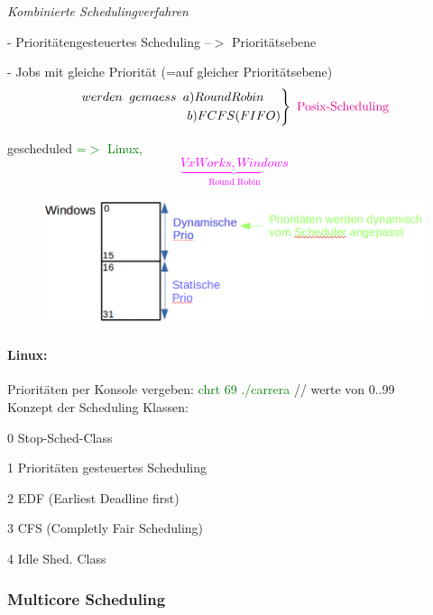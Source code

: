 \documentclass[12pt,a4paper,oneside,ngerman]{article}
\begin{document}
\emph{Kombinierte Schedulingverfahren}
\begin{description}
	\item - Prioritätengesteuertes Scheduling --$>$ Prioritätsebene
	\item - Jobs mit gleiche Priorität (=auf gleicher Prioritätsebene)
	\begin{equation*}
		\begin{rcases}
				werden \textcolor{white}{a} gemaess \textcolor{white}{a} a) Round Robin\\
				\textcolor{white}{werden gemaessaai } b) FCFS (FIFO)
		\end{rcases} 
		\text{ \textcolor{magenta}{Posix-Scheduling}}
	\end{equation*}
	\item gescheduled \textcolor{green}{=$>$ Linux,} \textcolor{magenta}{{ \[\underbrace{VxWorks, Windows}_{\text{Round Robin}} \]}}
\end{description}

\begin{figure}[H]
	\centering
	\includegraphics[scale=0.5]{umlet/windows_prio.png}
\end{figure}

\paragraph{Linux:}
Prioritäten per Konsole vergeben: \textcolor{green}{chrt 69 ./carrera} // werte von 0..99 \\
Konzept der Scheduling Klassen:
\begin{description}
	\item 0 Stop-Sched-Class
	\item 1 Prioritäten gesteuertes Scheduling
	\item 2 EDF (Earliest Deadline first)
	\item 3 CFS (Completly Fair Scheduling)
	\item 4 Idle Shed. Class
\end{description}

\subsubsection{Multicore Scheduling}
\end{document}
